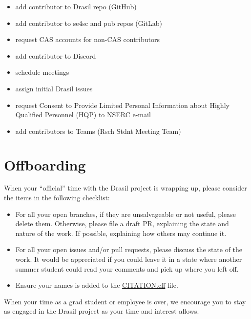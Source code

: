 \documentclass[12pt]{article}
\begin{document}
\begin{itemize}
\item add contributor to Drasil repo (GitHub)
\item add contributor to se4sc and pub repos (GitLab)
\item request CAS accounts for non-CAS contributors
\item add contributor to Discord
\item schedule meetings
\item assign initial Drasil issues
\item request Consent to Provide Limited Personal Information about Highly
Qualified Personnel (HQP) to NSERC e-mail
\item add contributors to Teams (Rsch Stdnt Meeting Team)
\end{itemize}

\section{Offboarding}

When your ``official'' time with the Drasil project is wrapping up, please consider
the items in the following checklist:

\begin{itemize}
\item For all your open branches, if they are unsalvageable or not useful,
please delete them. Otherwise, please file a draft PR, explaining the state and
nature of the work. If possible, explaining how others may continue it.
\item For all your open issues and/or pull requests, please discuss the state
of the work. It would be appreciated if you could leave it in a state where another
summer student could read your comments and pick up where you left off.
\item Ensure your names is added to the
\href{https://github.com/JacquesCarette/Drasil/blob/main/CITATION.cff}
{CITATION.cff} file.
\end{itemize}

When your time as a grad student or employee is over, we encourage you to stay
as engaged in the Drasil project as your time and interest allows.
\end{document}
